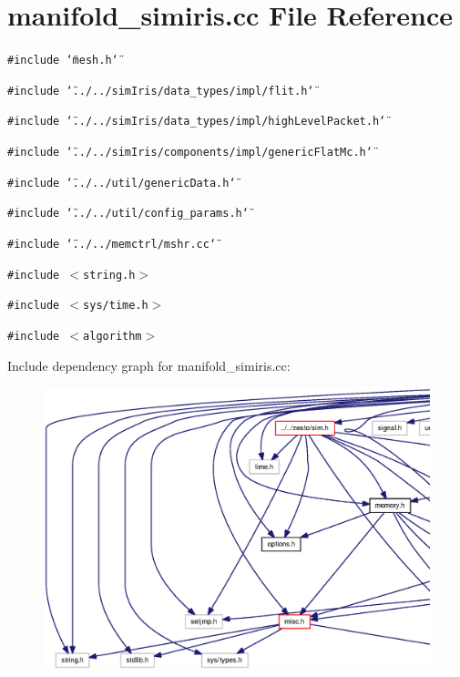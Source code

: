 \section{manifold\_\-simiris.cc File Reference}
\label{manifold__simiris_8cc}
{\tt \#include \char`\"{}mesh.h\char`\"{}}\par
{\tt \#include \char`\"{}../../simIris/data\_\-types/impl/flit.h\char`\"{}}\par
{\tt \#include \char`\"{}../../simIris/data\_\-types/impl/highLevelPacket.h\char`\"{}}\par
{\tt \#include \char`\"{}../../simIris/components/impl/genericFlatMc.h\char`\"{}}\par
{\tt \#include \char`\"{}../../util/genericData.h\char`\"{}}\par
{\tt \#include \char`\"{}../../util/config\_\-params.h\char`\"{}}\par
{\tt \#include \char`\"{}../../memctrl/mshr.cc\char`\"{}}\par
{\tt \#include $<$string.h$>$}\par
{\tt \#include $<$sys/time.h$>$}\par
{\tt \#include $<$algorithm$>$}\par


Include dependency graph for manifold\_\-simiris.cc:\nopagebreak
\begin{figure}[H]
\begin{center}
\leavevmode
\includegraphics[width=420pt]{manifold__simiris_8cc__incl}
\end{center}
\end{figure}
